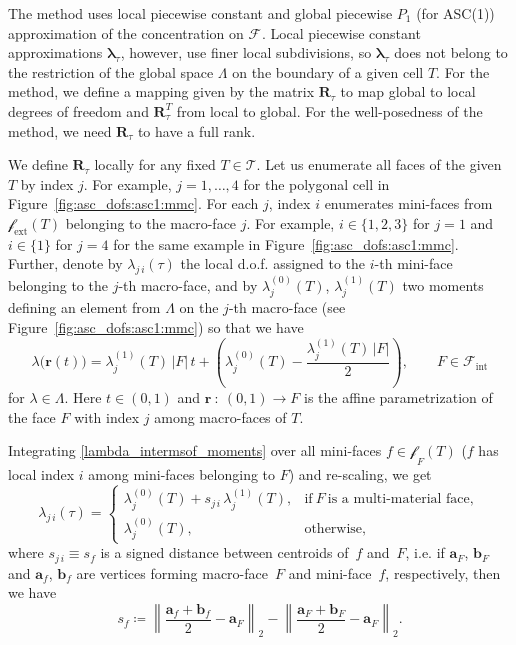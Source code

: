 \documentclass[12pt]{article}
\newcommand{\vect}[1]{\boldsymbol{\mathbf{#1}}}
\newcommand{\bcell}{T}
\newcommand{\bmesh}{{\vect{\mathcal T}}}
\newcommand{\mmesh}{{\vect{\mathcal \tau}}}
\newcommand{\bface}{F}
\newcommand{\bfaces}[1][]{{\vect{\mathcal F}_{\text{#1}}}}
\newcommand{\mfaces}[1][]{{\vect{\mathcal f}_{\text{#1}}}}
\begin{document}
	The method uses local piecewise constant  and global piecewise $P_1$ \big(for ASC(1)\big) approximation of the concentration on $\bfaces$. Local piecewise constant approximations $\vect\lambda_\mmesh$, however, use finer local subdivisions, so $\vect\lambda_\mmesh$ does not belong to the restriction of the global space $\Lambda$ on the boundary of a given cell $T$. For the method, we define a mapping given by the matrix $\vect R_\mmesh$ to map global to local degrees of freedom and $\vect R_\mmesh^T$ from local   to global. For the well-posedness of the method, we need $\vect R_\mmesh$ to have a full rank.
	
	We define $\vect R_\mmesh$ locally for any fixed $\bcell\in\bmesh$. Let us enumerate all faces of the given $T$ by index $j$. For example, $j=1,\dots,4$ for the polygonal cell in Figure~\ref{fig:asc_dofs:asc1:mmc}. For each $j$, index $i$ enumerates mini-faces from $\mfaces[ext](T)$ belonging to the macro-face $j$. For example, $i\in\{1,2,3\}$ for $j=1$ and $i\in\{1\}$ for $j=4$ for the same example in Figure~\ref{fig:asc_dofs:asc1:mmc}. Further, denote by $\lambda_{j\,i}(\mmesh)$ the local d.o.f. assigned to the $i$-th mini-face belonging to the $j$-th macro-face, and by $\lambda^{(0)}_{j}(T)$, $\lambda^{(1)}_{j}(T)$ two moments defining an element from $\Lambda$ on the $j$-th macro-face (see Figure~\ref{fig:asc_dofs:asc1:mmc}) so that we have
	\begin{equation}\label{lambda_intermsof_moments}
		{\lambda}\big({\vect r}(t)\big) = \lambda^{(1)}_{j}(T)\,|F|\,t + \left( \lambda^{(0)}_{j}(T) - \frac{\lambda^{(1)}_{j}(T)\,|F|}{2} \right),\qquad  F\in\bfaces[int]
	\end{equation}
	for $\lambda\in\Lambda$. Here $t\in(0,1)$ and ${\vect r}\::\:\left(0,1\right) \rightarrow F$ is the affine parametrization of the face $F$ with index $j$ among macro-faces of $T$.
	
	Integrating \eqref{lambda_intermsof_moments} over all mini-faces $f \in \mfaces_\bface(\bcell)$ ($f$ has local index $i$ among mini-faces belonging to $F$) and re-scaling, we get
	\begin{equation}\label{asc1_interp}
		\lambda_{j\,i}(\mmesh) =
		\begin{cases}
			\lambda^{(0)}_{j}(\bcell) +  s_{j\,i}\,\lambda^{(1)}_{j}(\bcell), & \text{if}~F~\text{is a multi-material face}, \\
			\lambda^{(0)}_{j}(\bcell),                                        & \text{otherwise},
		\end{cases}
	\end{equation}
	{\color{blue}where $s_{j\,i} \equiv s_f$ is a signed distance between centroids of~$f$  and~$F$, i.e. if $\vect a_F$, $\vect b_F$ and $\vect a_f$, $\vect b_f$ are vertices forming macro-face~$F$ and mini-face~$f$, respectively, then we have}
	\begin{equation}\label{sdist}
		s_f \coloneqq \left\| \frac{\vect a_f + \vect b_f}{2} - \vect a_F \right\|_2 - \left\| \frac{\vect a_F + \vect b_F}{2} - \vect a_F\right\|_2.
	\end{equation}
	
\end{document}
